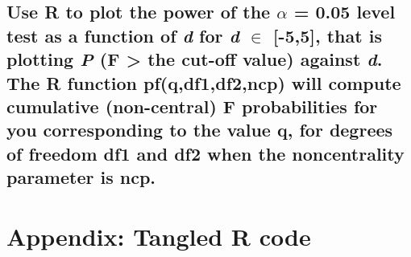 \documentclass[11pt]{article}
\begin{document}
\subsection{Use R to plot the power of the $\alpha$ = 0.05 level test as a function of \emph{d} for \emph{d} $\in$ [-5,5], that is plotting \emph{P} (F > the cut-off value) against \emph{d}. The R function pf(q,df1,df2,ncp) will compute cumulative (non-central) F probabilities for you corresponding to the value q, for degrees of freedom df1 and df2 when the noncentrality parameter is ncp.}
\label{sec-3-2}


\newpage
\section{Appendix: Tangled R code}
\label{sec-4}



\end{document}
